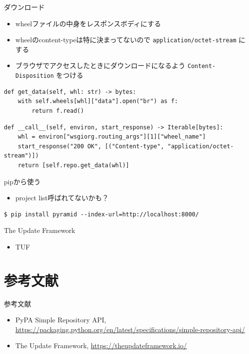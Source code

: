 \documentclass[presentation]{beamer}
\begin{document}
\begin{frame}[label={sec:orgeed7d1a},fragile]{ダウンロード}
 \begin{itemize}
\item wheelファイルの中身をレスポンスボディにする
\item wheelのcontent-typeは特に決まってないので \texttt{application/octet-stream} にする
\item ブラウザでアクセスしたときにダウンロードになるよう \texttt{Content-Disposition} をつける
\end{itemize}
\begin{verbatim}
def get_data(self, whl: str) -> bytes:
    with self.wheels[whl]["data"].open("br") as f:
        return f.read()

\end{verbatim}
\begin{verbatim}
def __call__(self, environ, start_response) -> Iterable[bytes]:
    whl = environ["wsgiorg.routing_args"][1]["wheel_name"]
    start_response("200 OK", [("Content-type", "application/octet-stream")])
    return [self.repo.get_data(whl)]

\end{verbatim}
\end{frame}
\begin{frame}[label={sec:org6626cbe},fragile]{pipから使う}
 \begin{itemize}
\item project list呼ばれてないかも？
\end{itemize}


\begin{verbatim}
$ pip install pyramid --index-url=http://localhost:8000/
\end{verbatim}
\end{frame}

\begin{frame}[label={sec:org88f7170}]{The Update Framework}
\begin{itemize}
\item TUF
\end{itemize}
\end{frame}

\section{参考文献}
\label{sec:org97b9b4a}
\begin{frame}[label={sec:org4ed43f2}]{参考文献}
\begin{itemize}
\item PyPA Simple Repository API, \url{https://packaging.python.org/en/latest/specifications/simple-repository-api/}
\item The Update Framework, \url{https://theupdateframework.io/}
\end{itemize}
\end{frame}
\end{document}
